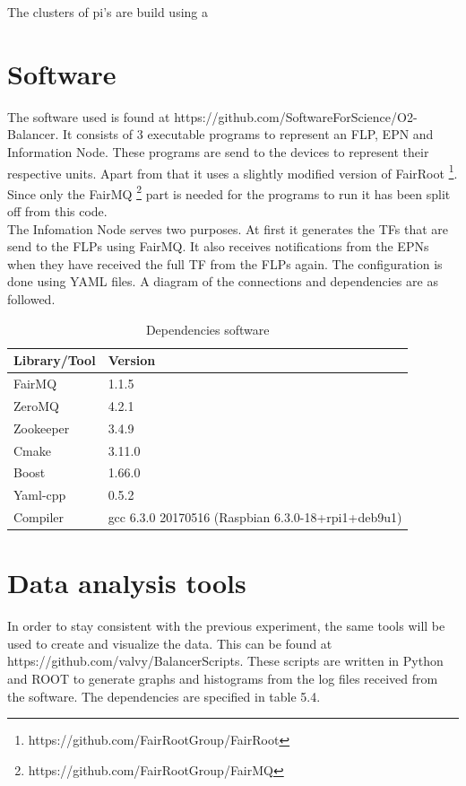 \newpage

The clusters of pi's are build using a 

\section{Software}
The software used is found at https://github.com/SoftwareForScience/O2-Balancer. It consists of 3 executable programs to represent an FLP, EPN and Information Node. These programs are send to the devices to represent their respective units. Apart from that it uses a slightly modified version of FairRoot
\footnote{https://github.com/FairRootGroup/FairRoot}. 
Since only the FairMQ
\footnote{https://github.com/FairRootGroup/FairMQ}
 part is needed for the programs to run it has been split off from this code.\\
The Infomation Node serves two purposes. At first it generates the TFs that are send to the FLPs using FairMQ. It also receives notifications from the EPNs when they have received the full TF from the FLPs again. The configuration is done using YAML files. A diagram of the connections and dependencies are as followed.


\begin{table}[htb]
\begin{tabular}{| l | l |}
\hline
Library/Tool & Version \\ \hline
FairMQ & 1.1.5\\ \hline
ZeroMQ & 4.2.1\\ \hline
Zookeeper & 3.4.9 \\ \hline
Cmake & 3.11.0 \\ \hline
Boost & 1.66.0 \\ \hline
Yaml-cpp & 0.5.2 \\ \hline
Compiler & gcc 6.3.0 20170516 (Raspbian 6.3.0-18+rpi1+deb9u1)\\ \hline
\end{tabular}
\caption{Dependencies software}
\end{table}

\section{Data analysis tools}
In order to stay consistent with the previous experiment, the same tools will be used to create and visualize the data. This can be found at \\ https://github.com/valvy/BalancerScripts. These scripts are written in Python and ROOT to generate graphs and histograms from the log files received from the software. The dependencies are specified in table 5.4.

